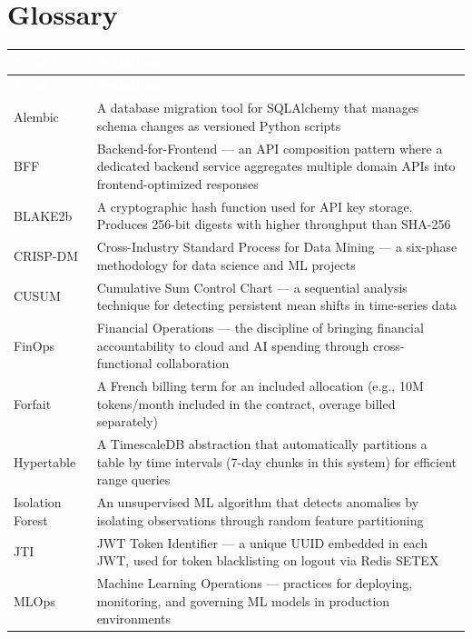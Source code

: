 \documentclass[12pt,a4paper,twoside]{report}
\begin{document}
\chapter{Glossary}

\begin{longtable}{|l|X|}
\hline
\rowcolor{tabheader}
\textcolor{white}{\textbf{Term}} &
\textcolor{white}{\textbf{Definition}} \\
\hline
\endfirsthead
\hline
\rowcolor{tabheader}
\textcolor{white}{\textbf{Term}} &
\textcolor{white}{\textbf{Definition}} \\
\hline
\endhead

Alembic & A database migration tool for SQLAlchemy that manages schema changes as versioned Python scripts \\
\hline
BFF & Backend-for-Frontend — an API composition pattern where a dedicated backend service aggregates multiple domain APIs into frontend-optimized responses \\
\hline
BLAKE2b & A cryptographic hash function used for API key storage. Produces 256-bit digests with higher throughput than SHA-256 \\
\hline
CRISP-DM & Cross-Industry Standard Process for Data Mining — a six-phase methodology for data science and ML projects \\
\hline
CUSUM & Cumulative Sum Control Chart — a sequential analysis technique for detecting persistent mean shifts in time-series data \\
\hline
FinOps & Financial Operations — the discipline of bringing financial accountability to cloud and AI spending through cross-functional collaboration \\
\hline
Forfait & A French billing term for an included allocation (e.g., 10M tokens/month included in the contract, overage billed separately) \\
\hline
Hypertable & A TimescaleDB abstraction that automatically partitions a table by time intervals (7-day chunks in this system) for efficient range queries \\
\hline
Isolation Forest & An unsupervised ML algorithm that detects anomalies by isolating observations through random feature partitioning \\
\hline
JTI & JWT Token Identifier — a unique UUID embedded in each JWT, used for token blacklisting on logout via Redis SETEX \\
\hline
MLOps & Machine Learning Operations — practices for deploying, monitoring, and governing ML models in production environments \\

\end{longtable}
\end{document}
